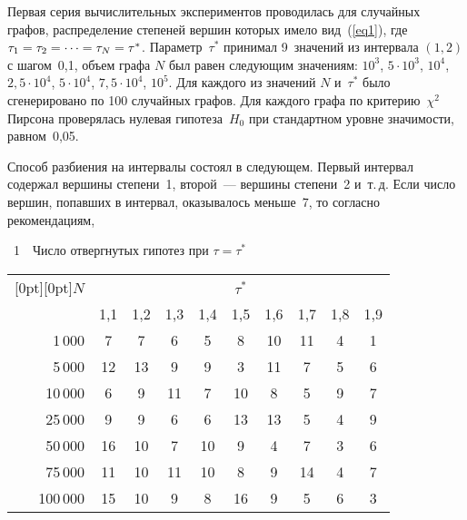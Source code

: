 \begin{multicols}{2}
Первая серия вычислительных экспериментов проводилась для
случайных графов, распределение степеней вершин которых имело вид~(\ref{eq1}), 
где $\tau_1\hm=\tau_2\hm=\dots=\tau_N\hm=\tau^*$. Параметр~$\tau^*$ принимал 
9~значений из интервала $(1,2)$ с шагом~0,1,
объем графа $N$ был равен следующим значениям: $10^3$,
$5\cdot10^3$, $10^4$, $2{,}5\cdot10^4$, $5\cdot10^4$,
$7{,}5\cdot10^4$, $10^5$. Для каждого из значений $N$ и~$\tau^*$
было сгенерировано по 100 случайных графов. Для каждого графа
по критерию~$\chi^2$ Пирсона проверялась нулевая гипотеза~$H_0$
при стандартном уровне значимости, равном~0,05. 

Способ раз\-би\-ения
на интервалы состоял в следующем. Первый интервал содержал
вершины степени~1, второй~--- вершины степени~2 и~т.\,д. Если
число вершин, попавших в интервал, оказывалось меньше~7, то
согласно рекомендациям,\linebreak
{\small \begin{center}
{{\tablename~1}\ \ \small{Число отвергнутых гипотез при $\tau = \tau^*$ }}
\vspace*{2ex}

\tabcolsep=4.5pt
\begin{tabular}{|r|c|c|c|c|c|c|c|c|c|}
\hline
\multicolumn{1}{|c|}{\raisebox{-6pt}[0pt][0pt]{$N$}} &\multicolumn{9}{c|}{$\tau^*$}\\
\cline{2-10}
& 1,1 & 1,2 & 1,3 & 1,4 & 1,5 & 1,6 & 1,7 & 1,8 & 1,9 \\ 
\hline
1\,000 & \hphantom{9}7 & \hphantom{9}7 & \hphantom{9}6 & \hphantom{9}5& \hphantom{9}8 & 10 & 11 & \hphantom{9}4 & \hphantom{9}1 \\
5\,000 & 12 & 13 & \hphantom{9}9 & \hphantom{9}9 & \hphantom{9}3 & 11 & \hphantom{9}7 & \hphantom{9}5 & \hphantom{9}6 \\
10\,000 & \hphantom{9}6 & \hphantom{9}9 & 11 & \hphantom{9}7 & 10 &\hphantom{9}8 & \hphantom{9}5 & \hphantom{9}9 & \hphantom{9}7 \\
25\,000 & \hphantom{9}9 & \hphantom{9}9 & \hphantom{9}6 & \hphantom{9}6 & 13 & 13 & \hphantom{9}5 & \hphantom{9}4 & \hphantom{9}9 \\
50\,000 & 16 & 10 & \hphantom{9}7 & 10 & \hphantom{9}9 & \hphantom{9}4 & \hphantom{9}7 & \hphantom{9}3 & \hphantom{9}6 \\
75\,000 & 11 & 10 & 11 & 10 & \hphantom{9}8 & \hphantom{9}9 & 14 & \hphantom{9}4 & \hphantom{9}7 \\
100\,000 & 15 & 10 & \hphantom{9}9 & \hphantom{9}8 & 16 & \hphantom{9}9 & \hphantom{9}5 & \hphantom{9}6 & \hphantom{9}3 \\ 
\hline
\end{tabular}
\end{center}}
\columnbreak


\end{multicols}
